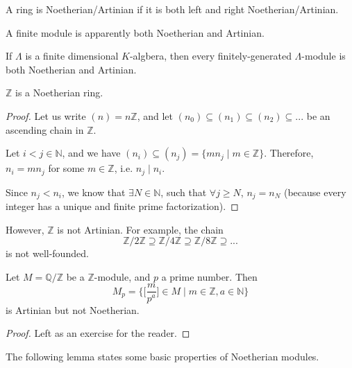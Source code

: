 \documentclass[12pt, a4paper, titlepage]{report}
\begin{document}
\begin{defn}
  A ring is Noetherian/Artinian if it is both left and right Noetherian/Artinian.
\end{defn}

\begin{rem}
  A finite module is apparently both Noetherian and Artinian.
\end{rem}

\begin{prop}
  If $\Lambda$ is a finite dimensional $K$-algbera, then every finitely-generated $\Lambda$-module is both Noetherian and Artinian.
\end{prop}

\begin{prop}
  $\mathbb{Z}$ is a Noetherian ring.
\end{prop}

\begin{proof}
  Let us write $(n) = n\mathbb{Z}$, and let $(n_0) \subseteq (n_1) \subseteq (n_2) \subseteq ...$ be an ascending chain in $\mathbb{Z}$.

  Let $i < j \in \mathbb{N}$, and we have $(n_i) \subseteq (n_j) = \{ mn_j \mid m \in \mathbb{Z} \}$. Therefore, $n_i = mn_j$ for some $m \in \mathbb{Z}$,
  i.e. $n_j \mid n_i$.

  Since $n_j < n_i$, we know that $\exists N \in \mathbb{N}$, such that $\forall j \geq N$, $n_j = n_N$ (because every integer has a unique and finite
  prime factorization).
\end{proof}

\begin{rem}
  However, $\mathbb{Z}$ is not Artinian. For example, the chain
  \[
    \mathbb{Z}/2\mathbb{Z} \supseteq \mathbb{Z}/4\mathbb{Z} \supseteq \mathbb{Z}/8\mathbb{Z} \supseteq ...
  \]
  is not well-founded.
\end{rem}

\begin{exmp}
  Let $M = \mathbb{Q}/\mathbb{Z}$ be a $\mathbb{Z}$-module, and $p$ a prime number. Then
  \[
    M_p = \big\{ \big[ \frac{m}{p^a} \big] \in M \mid m \in \mathbb{Z}, a \in \mathbb{N} \big\}
  \]
  is Artinian but not Noetherian.
\end{exmp}

\begin{proof} Left as an exercise for the reader. \end{proof}

The following lemma states some basic properties of Noetherian modules.
\end{document}

